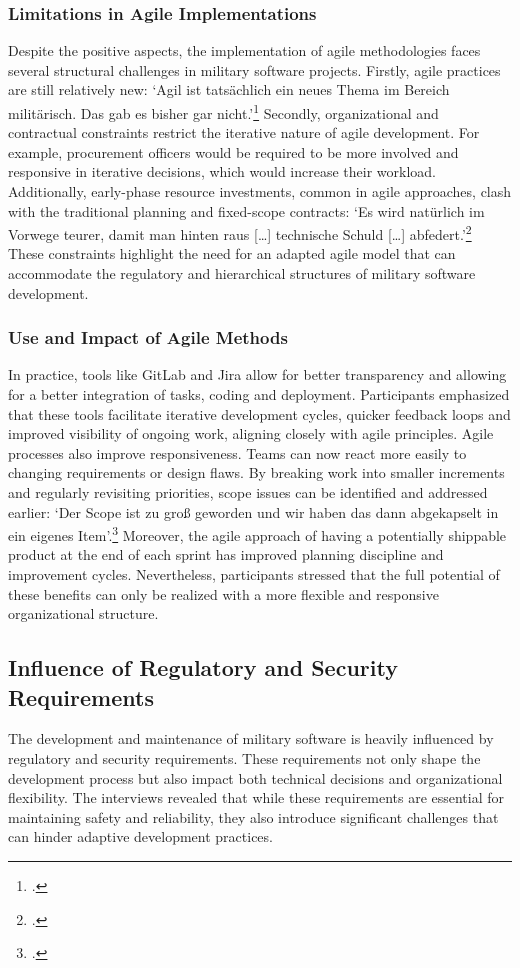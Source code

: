 \subsubsection{Limitations in Agile Implementations}
Despite the positive aspects, the implementation of agile methodologies faces several structural challenges in military software projects. Firstly, agile practices are still relatively new: `Agil ist tatsächlich ein neues Thema im Bereich militärisch. Das gab es bisher gar nicht.'\footcite{interview1}
Secondly, organizational and contractual constraints restrict the iterative nature of agile development. For example, procurement officers would be required to be more involved and responsive in iterative decisions, which would increase their workload. Additionally, early-phase resource investments, common in agile approaches,
clash with the traditional planning and fixed-scope contracts: `Es wird natürlich im Vorwege teurer, damit man hinten raus [\ldots] technische Schuld [\ldots] abfedert.'\footcite{interview1} These constraints highlight the need for an adapted agile model that can accommodate the regulatory and hierarchical structures of military software development.\\

\subsubsection{Use and Impact of Agile Methods}
In practice, tools like GitLab and Jira allow for better transparency and allowing for a better integration of tasks, coding and deployment. Participants emphasized that these tools facilitate iterative development cycles, quicker feedback loops and 
improved visibility of ongoing work, aligning closely with agile principles. 
Agile processes also improve responsiveness. Teams can now react more easily to changing requirements or design flaws. By breaking work into smaller increments and regularly revisiting priorities, scope issues can be identified and addressed earlier:
`Der Scope ist zu groß geworden und wir haben das dann abgekapselt in ein eigenes Item'.\footcite{interview3} Moreover, the agile approach of having a potentially shippable product at the end of each sprint has improved planning discipline and improvement cycles.
Nevertheless, participants stressed that the full potential of these benefits can only be realized with a more flexible and responsive organizational structure.\\

\subsection{Influence of Regulatory and Security Requirements}
The development and maintenance of military software is heavily influenced by regulatory and security requirements. These requirements not only shape the development process but also impact both technical decisions and organizational flexibility.
The interviews revealed that while these requirements are essential for maintaining safety and reliability, they also introduce significant challenges that can hinder adaptive development practices.

